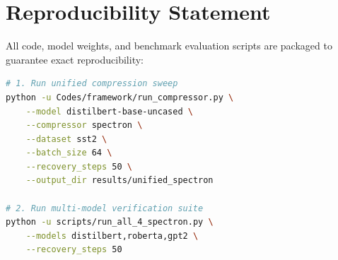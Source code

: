 \section{Reproducibility Statement}
All code, model weights, and benchmark evaluation scripts are packaged to guarantee exact reproducibility:
\begin{lstlisting}[language=bash]
# 1. Run unified compression sweep
python -u Codes/framework/run_compressor.py \
    --model distilbert-base-uncased \
    --compressor spectron \
    --dataset sst2 \
    --batch_size 64 \
    --recovery_steps 50 \
    --output_dir results/unified_spectron

# 2. Run multi-model verification suite
python -u scripts/run_all_4_spectron.py \
    --models distilbert,roberta,gpt2 \
    --recovery_steps 50
\end{lstlisting}

